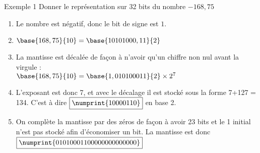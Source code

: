 \documentclass[10pt]{beamer}
\begin{document}
\begin{frame}{\Ctitle}{\stitle}
    \begin{exampleblock}{Exemple 1}
        Donner le représentation sur 32 bits du nombre $-168,75$
        \begin{enumerate}
            \item<2-> Le nombre est négatif, donc le bit de signe est \textcolor{BrickRed}{$\boxed{1}$}.
            \item<3-> $\base{168,75}{10} = \base{10101000,11}{2}$
            \item<4-> La mantisse est décalée de façon à n'avoir qu'un chiffre non nul avant la virgule : \\
            $\base{168,75}{10} = \base{1,010100011}{2} \times 2^{7}$
            \item<5-> L'exposant est donc 7, et avec le décalage il est stocké sous la forme 7+127 = 134. C'est à dire \textcolor{blue}{$\boxed{\numprint{10000110}}$} en base 2. 
            \item<6-> On complète la mantisse par des zéros de façon à avoir 23 bits et le 1 initial  n'est pas stocké afin d'économiser un bit. La mantisse est donc \textcolor{OliveGreen}{$\boxed{\numprint{01010001100000000000000}}$}
        \end{enumerate}
    \end{exampleblock}
\end{frame}
\end{document}
